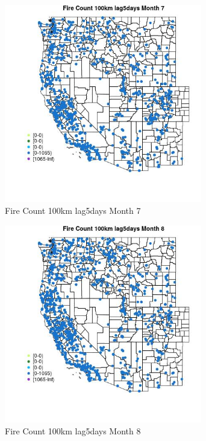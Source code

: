 \begin{figure} 
\centering  
\includegraphics[width=0.77\textwidth]{Code_Outputs/Report_ML_input_PM25_Step4_part_f_de_duplicated_aves_prioritize_24hr_obswNAs_MapObsMo7Fire_Count_100km_lag5days.jpg} 
\caption{\label{fig:Report_ML_input_PM25_Step4_part_f_de_duplicated_aves_prioritize_24hr_obswNAsMapObsMo7Fire_Count_100km_lag5days}Fire Count 100km lag5days Month 7} 
\end{figure} 
 

\begin{figure} 
\centering  
\includegraphics[width=0.77\textwidth]{Code_Outputs/Report_ML_input_PM25_Step4_part_f_de_duplicated_aves_prioritize_24hr_obswNAs_MapObsMo8Fire_Count_100km_lag5days.jpg} 
\caption{\label{fig:Report_ML_input_PM25_Step4_part_f_de_duplicated_aves_prioritize_24hr_obswNAsMapObsMo8Fire_Count_100km_lag5days}Fire Count 100km lag5days Month 8} 
\end{figure} 
 

